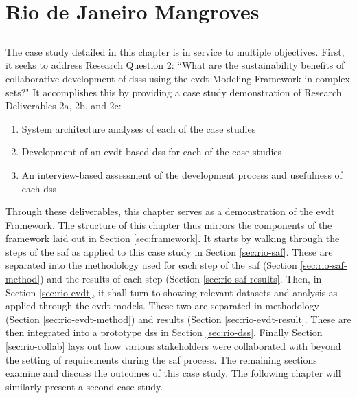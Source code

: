 \chapter{Rio de Janeiro Mangroves} \label{ch:mangroves}

\section{}

The case study detailed in this chapter is in service to multiple objectives. First, it seeks to address Research Question 2: ``What are the sustainability benefits of collaborative development of \acp{dss} using the \acf{evdt} Modeling Framework in complex \acf{sets}?" It accomplishes this by providing a case study demonstration of Research Deliverables 2a, 2b, and 2c: 

\begin{enumerate}[label=\emph{\alph*},itemsep=0pt,parsep=0pt]
	\item{System architecture analyses of each of the case studies} 
	\item{Development of an \ac{evdt}-based \acf{dss} for each of the case studies} 
	\item{An interview-based assessment of the development process and usefulness of each \ac{dss}} 
\end{enumerate}
	
Through these deliverables, this chapter serves as a demonstration of the \ac{evdt} Framework. The structure of this chapter thus mirrors the components of the framework laid out in Section \ref{sec:framework}. It starts by walking through the steps of the \acf{saf} as applied to this case study in Section \ref{sec:rio-saf}. These are separated into the methodology used for each step of the \ac{saf} (Section \ref{sec:rio-saf-method}) and the results of each step (Section \ref{sec:rio-saf-results}. Then, in Section \ref{sec:rio-evdt}, it shall turn to showing relevant datasets and analysis as applied through the \acf{evdt} models. These two are separated in methodology (Section \ref{sec:rio-evdt-method}) and results (Section \ref{sec:rio-evdt-result}. These are then integrated into a prototype \ac{dss} in Section \ref{sec:rio-dss}. Finally Section \ref{sec:rio-collab} lays out how various stakeholders were collaborated with beyond the setting of requirements during the \ac{saf} process. The remaining sections examine and discuss the outcomes of this case study. The following chapter will similarly present a second case study.  

